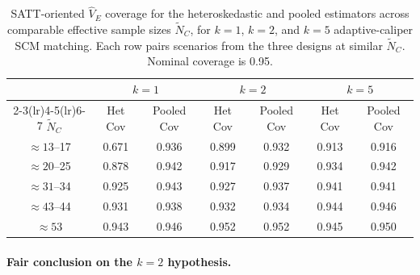 \documentclass[11pt]{article}
\begin{document}
\begin{table}[hbt!]
\centering
\begin{tabular}{ccccccc}
  \hline
  & \multicolumn{2}{c}{$k=1$} & \multicolumn{2}{c}{$k=2$} & \multicolumn{2}{c}{$k=5$} \\
  \cmidrule(lr){2-3}\cmidrule(lr){4-5}\cmidrule(lr){6-7}
  $\tilde{N}_C$ & Het Cov & Pooled Cov & Het Cov & Pooled Cov & Het Cov & Pooled Cov \\
  \hline
  $\approx 13$--17 & 0.671 & 0.936 & 0.899 & 0.932 & 0.913 & 0.916 \\
  $\approx 20$--25 & 0.878 & 0.942 & 0.917 & 0.929 & 0.934 & 0.942 \\
  $\approx 31$--34 & 0.925 & 0.943 & 0.927 & 0.937 & 0.941 & 0.941 \\
  $\approx 43$--44 & 0.931 & 0.938 & 0.932 & 0.934 & 0.944 & 0.946 \\
  $\approx 53$     & 0.943 & 0.946 & 0.952 & 0.952 & 0.945 & 0.950 \\
  \hline
\end{tabular}
\caption{SATT-oriented $\hat{V}_E$ coverage for the heteroskedastic and pooled estimators across comparable effective sample sizes $\tilde{N}_C$, for $k=1$, $k=2$, and $k=5$ adaptive-caliper SCM matching. Each row pairs scenarios from the three designs at similar $\tilde{N}_C$. Nominal coverage is 0.95.}
\label{tab:compare_k125}
\end{table}

\paragraph{Fair conclusion on the $k=2$ hypothesis.}
\end{document}
